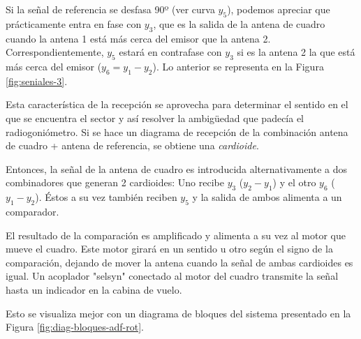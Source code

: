 Si la se\~nal de referencia se desfasa 90º (ver curva $y_5$), podemos apreciar que pr\'acticamente entra en fase con $y_3$, que es la salida de la antena de cuadro cuando la antena 1 est\'a m\'as cerca del emisor que la antena 2. Correspondientemente, $y_5$ estar\'a en contrafase con $y_3$ si es la antena 2 la que est\'a m\'as cerca del emisor ($y_6 = y_1 - y_2$). Lo anterior se representa en la Figura \ref{fig:seniales-3}. 

Esta caracter\'istica de la recepci\'on se aprovecha para determinar el sentido en el que se encuentra el sector y as\'i resolver la ambigüedad que padec\'ia el radiogoni\'ometro. Si se hace un diagrama de recepci\'on de la combinaci\'on antena de cuadro + antena de referencia, se obtiene una \emph{cardioide}.


Entonces, la se\~nal de la antena de cuadro es introducida alternativamente a dos combinadores que generan 2 cardioides: Uno recibe $y_3$ ($y_2-y_1$) y el otro $y_6$ ($y_1-y_2$). \'Estos a su vez tambi\'en reciben $y_5$ y la salida de ambos alimenta a un comparador.

El resultado de la comparaci\'on es amplificado y alimenta a su vez al motor que mueve el cuadro. Este motor girar\'a en un sentido u otro seg\'un el signo de la comparaci\'on, dejando de mover la antena cuando la se\~nal de ambas cardioides es igual. Un acoplador "selsyn" conectado al motor del cuadro transmite la se\~nal hasta un indicador en la cabina de vuelo.

Esto se visualiza mejor con un diagrama de bloques del sistema presentado en la Figura \ref{fig:diag-bloques-adf-rot}.


